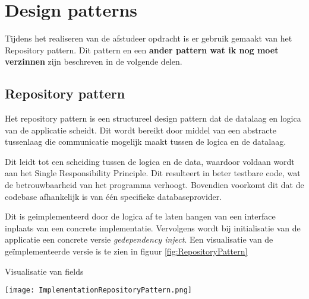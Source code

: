 \section{Design patterns}
Tijdens het realiseren van de afstudeer opdracht is er gebruik gemaakt van het Repository pattern.
Dit pattern en een \textbf{ander pattern wat ik nog moet verzinnen} zijn beschreven in de volgende delen.

\subsection{Repository pattern}
Het repository pattern is een structureel design pattern dat de datalaag en logica van de applicatie scheidt.
Dit wordt bereikt door middel van een abstracte tussenlaag die communicatie mogelijk maakt tussen de logica en de datalaag.

\whitespace
Dit leidt tot een scheiding tussen de logica en de data, waardoor voldaan wordt aan het Single Responsibility Principle.
Dit resulteert in beter testbare code, wat de betrouwbaarheid van het programma verhoogt.
Bovendien voorkomt dit dat de codebase afhankelijk is van één specifieke databaseprovider.

\whitespace
Dit is geimplementeerd door de logica af te laten hangen van een interface inplaats van een concrete implementatie.
Vervolgens wordt bij initialisatie van de applicatie  een concrete versie \textit{gedependency inject}.
Een visualisatie van de geïmplementeerde versie is te zien in figuur \ref{fig:RepositoryPattern}

\whitespace[2]
\begin{graphic}
    \captionsetup{type=figure}
    \caption{Visualisatie van fields}
    \texttt{[image: ImplementationRepositoryPattern.png]}
    \label{fig:RepositoryPattern}
\end{graphic}
